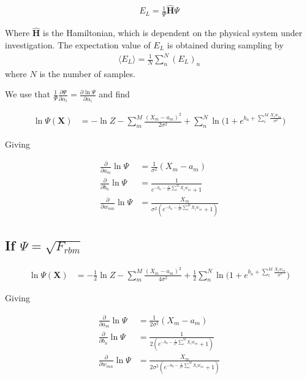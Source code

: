 \documentclass[norsk,a4paper,11pt]{article}
\begin{document}
\begin{align}
	E_L = \frac{1}{\Psi} \hat{\mathbf{H}} \Psi
\end{align}

Where $\hat{\mathbf{H}}$ is the Hamiltonian, which is dependent on the physical system under investigation. The expectation value of $E_L$ is obtained during sampling by
\begin{align}
	\langle E_L \rangle = \frac{1}{N}\sum_n^N (E_L)_n
\end{align}
where $N$ is the number of samples.

We use that $\frac{1}{\Psi}\frac{\partial \Psi}{\partial \alpha_i} 
	= \frac{\partial \ln{\Psi}}{\partial \alpha_i}$
and find

\begin{align}
	\ln{\Psi({\mathbf{X}})} &= -\ln{Z} - \sum_m^M \frac{(X_m - a_m)^2}{2\sigma^2}
	+ \sum_n^N \ln({1 + e^{b_n + \sum_i^M \frac{X_i w_{in}}{\sigma^2}})}
\end{align}

Giving

\begin{align}
	\frac{\partial }{\partial a_m} \ln\Psi
	&= 	\frac{1}{\sigma^2} (X_m - a_m) \\
	\frac{\partial }{\partial b_n} \ln\Psi
	&=
	\frac{1}{e^{-b_n-\frac{1}{\sigma^2}\sum_i^M X_i w_{in}} + 1} \\
	\frac{\partial }{\partial w_{mn}} \ln\Psi
	&= \frac{X_m}{\sigma^2(e^{-b_n-\frac{1}{\sigma^2}\sum_i^M X_i w_{in}} + 1)}
\end{align}

\subsection{If $\Psi = \sqrt{F_{rbm}}$}

\begin{align}
	\ln{\Psi({\mathbf{X}})} &= -\frac{1}{2}\ln{Z} - \sum_m^M \frac{(X_m - a_m)^2}{4\sigma^2}
	+ \frac{1}{2}\sum_n^N \ln({1 + e^{b_n + \sum_i^M \frac{X_i w_{in}}{\sigma^2}})}
\end{align}

Giving

\begin{align}
	\frac{\partial }{\partial a_m} \ln\Psi
	&= 	\frac{1}{2\sigma^2} (X_m - a_m) \\
	\frac{\partial }{\partial b_n} \ln\Psi
	&=
	\frac{1}{2(e^{-b_n-\frac{1}{\sigma^2}\sum_i^M X_i w_{in}} + 1)} \\
	\frac{\partial }{\partial w_{mn}} \ln\Psi
	&= \frac{X_m}{2\sigma^2(e^{-b_n-\frac{1}{\sigma^2}\sum_i^M X_i w_{in}} + 1)}
\end{align}
\end{document}
